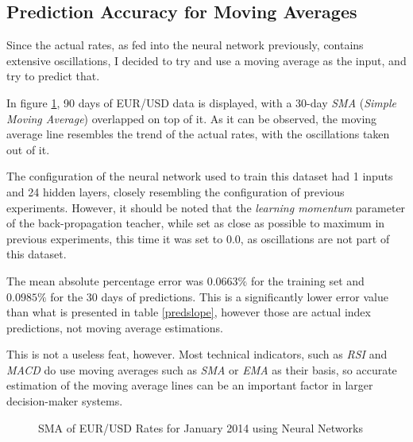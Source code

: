 \documentclass[a4paper,12pt]{article}
\begin{document}
\clearpage
\newpage
\subsection{Prediction Accuracy for Moving Averages}

	Since the actual rates, as fed into the neural network previously, contains extensive oscillations, I decided to try and use a moving average as the input, and try to predict that.
	
	In figure \ref{eur_usd_sma_january_90}, 90 days of EUR/USD data is displayed, with a 30-day \textit{SMA} (\textit{Simple Moving Average}) overlapped on top of it. As it can be observed, the moving average line resembles the trend of the actual rates, with the oscillations taken out of it.
	
	The configuration of the neural network used to train this dataset had 1 inputs and 24 hidden layers, closely resembling the configuration of previous experiments. However, it should be noted that the \textit{learning momentum} parameter of the back-propagation teacher, while set as close as possible to maximum in previous experiments, this time it was set to $0.0$, as oscillations are not part of this dataset.

	The mean absolute percentage error was $0.0663\%$ for the training set and $0.0985\%$ for the 30 days of predictions. This is a significantly lower error value than what is presented in table \ref{predslope}, however those are actual index predictions, not moving average estimations.

	This is not a useless feat, however. Most technical indicators, such as \textit{RSI} and \textit{MACD} do use moving averages such as \textit{SMA} or \textit{EMA} as their basis, so accurate estimation of the moving average lines can be an important factor in larger decision-maker systems.

	\begin{figure}[!htbp]
		\centering
		\caption{SMA of EUR/USD Rates for January 2014 using Neural Networks}
		\label{eur_usd_sma_january_90}
	\end{figure}
\end{document}
